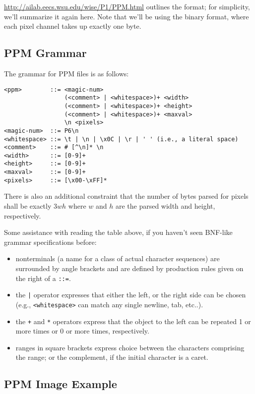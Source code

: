 \documentclass{article}
\begin{document}
\url{http://ailab.eecs.wsu.edu/wise/P1/PPM.html} outlines the format; for simplicity, we'll summarize it again here. Note that we'll be using the binary format, where each pixel channel takes up exactly one byte.

\subsection*{PPM Grammar}

The grammar for PPM files is as follows:

\begin{verbatim}
<ppm>        ::= <magic-num>
                 (<comment> | <whitespace>)+ <width>
                 (<comment> | <whitespace>)+ <height>
                 (<comment> | <whitespace>)+ <maxval>
                 \n <pixels>
<magic-num>  ::= P6\n
<whitespace> ::= \t | \n | \x0C | \r | ' ' (i.e., a literal space)
<comment>    ::= # [^\n]* \n
<width>      ::= [0-9]+
<height>     ::= [0-9]+
<maxval>     ::= [0-9]+
<pixels>     ::= [\x00-\xFF]*
\end{verbatim}

There is also an additional constraint that the number of bytes parsed for pixels shall be exactly \(3wh\) where \(w\) and \(h\) are the parsed width and height, respectively.

Some assistance with reading the table above, if you haven't seen BNF-like grammar specifications before:
\begin{itemize}
    \item nonterminals (a name for a class of actual character sequences) are surrounded by angle brackets and are defined by production rules given on the right of a \texttt{::=}.
    \item the \texttt{|} operator expresses that either the left, or the right side can be chosen (e.g., \texttt{<whitespace>} can match any single newline, tab, etc..).
    \item the \texttt{+} and \texttt{*} operators express that the object to the left can be repeated 1 or more times or 0 or more times, respectively.
    \item ranges in square brackets express choice between the characters comprising the range; or the complement, if the initial character is a caret.
\end{itemize}

\subsection*{PPM Image Example}
\end{document}
